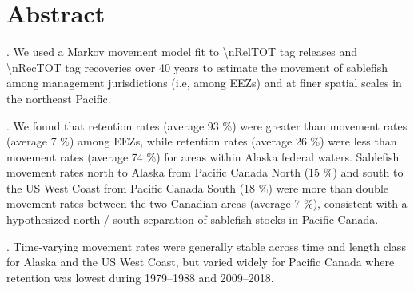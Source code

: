 \documentclass{article}
\begin{document}












\section{Abstract}
. We used a Markov movement model fit to \num{\nRelTOT} tag releases and \num{\nRecTOT} tag recoveries over 40 years to estimate the movement of  sablefish among management jurisdictions (i.e, among EEZs) and at finer spatial scales in the northeast Pacific.

. We found that retention rates (average 93 \%) were greater than movement rates (average 7 \%) among EEZs, while retention rates (average 26 \%) were less than movement rates (average 74 \%) for areas within Alaska federal waters. Sablefish movement rates north to Alaska from Pacific Canada North (15 \%) and south to the US West Coast from Pacific Canada South (18 \%) were more than double movement rates between the two Canadian areas (average 7 \%), consistent with a hypothesized north / south separation of sablefish stocks in Pacific Canada. 

. Time-varying movement rates were generally stable across time and length class for Alaska and the US West Coast, but varied widely for Pacific Canada where retention was lowest during 1979--1988 and 2009--2018.
\end{document}
